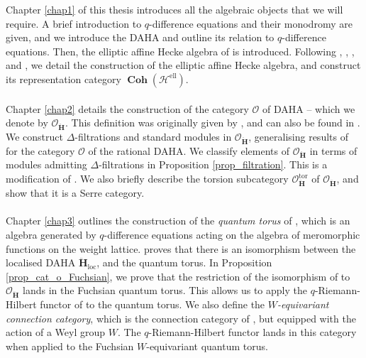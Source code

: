 \documentclass[a4paper]{report}
\theoremstyle{theorem}
\theoremstyle{definition}
\theoremstyle{remark}
\theoremstyle{proposition}
\theoremstyle{conjecture}
\theoremstyle{lemma}
\theoremstyle{corollary}
\theoremstyle{exercise}
\theoremstyle{example}
\newcommand{\mcal}{\mathcal}
\newcommand{\on}{\operatorname}
\newcommand{\coh}{\on{\mathbf{Coh}}}
\begin{document}
  Chapter \ref{chap1} of this thesis introduces all the algebraic objects 
  that we will require. A brief introduction to $q$-difference equations and their monodromy 
  are given, and we introduce the DAHA and outline its relation to $q$-difference equations. Then, the elliptic affine Hecke algebra of \cite{gkv95} is introduced.
  Following \cite{gkv95}, \cite{LZZ23}, \cite{ZZ21}, and \cite{ZZ24}, we detail the construction of the elliptic
  affine Hecke algebra, and construct its representation category $\coh(\mcal{H}^{\on{ell}})$.\\\\
  Chapter \ref{chap2} details the construction of the 
  category $\mcal{O}$ of DAHA -- which we denote by $\mcal{O}_{\mathbf{\ddot{\mathbf{H}}}}$. This definition was originally given by \cite{che95}, and can also be 
  found in \cite{jv19}. We construct $\Delta$-filtrations and standard modules
  in $\mcal{O}_{\mathbf{\ddot{\mathbf{H}}}}$, generalising results of \cite{ggor03} for the category $\mcal{O}$ of the rational 
  DAHA. We classify elements of 
  $\mcal{O}_{\mathbf{\ddot{\mathbf{H}}}}$ in terms of modules admitting $\Delta$-filtrations in 
  Proposition \ref{prop_filtration}.  This is a modification of \cite[Proposition 2.2]{ggor03}.
  We also briefly describe the torsion subcategory $\mcal{O}_{\mathbf{\ddot{\mathbf{H}}}}^{\on{tor}}$ of 
  $\mcal{O}_{\mathbf{\ddot{\mathbf{H}}}}$, and show that it is a Serre category.\\\\
  Chapter \ref{chap3} outlines the construction of the \emph{quantum torus} of \cite{beg00}, which is an 
  algebra generated by $q$-difference equations acting on the algebra of meromorphic functions on the weight lattice.
  \cite[Theorem 7.2]{beg00} proves that there is an isomorphism between the localised DAHA $\mathbf{\ddot{\mathbf{H}}}_{\on{loc}}$,
  and the quantum torus. In Proposition \ref{prop_cat_o_Fuchsian}, 
  we prove that the restriction of the isomorphism of \cite[Theorem 7.2]{beg00} to $\mcal{O}_{\mathbf{\ddot{\mathbf{H}}}}$ 
  lands in the Fuchsian quantum torus. This allows us to apply the $q$-Riemann-Hilbert functor of \cite{sauloy03} to 
  the quantum torus. We also define the \emph{$W$-equivariant connection category},
  which is the connection category of \cite{sauloy03}, but equipped with the action of a Weyl group $W$.
  The $q$-Riemann-Hilbert functor lands in this category when applied to the Fuchsian $W$-equivariant quantum torus.\\\\
\end{document}
